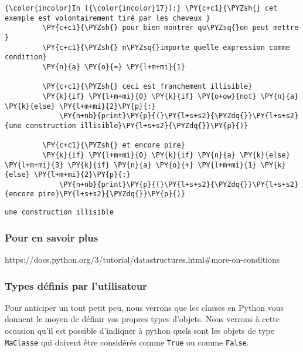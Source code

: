     \begin{Verbatim}[commandchars=\\\{\},frame=single,framerule=0.3mm,rulecolor=\color{cellframecolor}]
{\color{incolor}In [{\color{incolor}17}]:} \PY{c+c1}{\PYZsh{} cet exemple est volontairement tiré par les cheveux }
         \PY{c+c1}{\PYZsh{} pour bien montrer qu\PYZsq{}on peut mettre }
         \PY{c+c1}{\PYZsh{} n\PYZsq{}importe quelle expression comme condition}
         \PY{n}{a} \PY{o}{=} \PY{l+m+mi}{1}
         
         \PY{c+c1}{\PYZsh{} ceci est franchement illisible}
         \PY{k}{if} \PY{l+m+mi}{0} \PY{k}{if} \PY{o+ow}{not} \PY{n}{a} \PY{k}{else} \PY{l+m+mi}{2}\PY{p}{:}
             \PY{n+nb}{print}\PY{p}{(}\PY{l+s+s2}{\PYZdq{}}\PY{l+s+s2}{une construction illisible}\PY{l+s+s2}{\PYZdq{}}\PY{p}{)}
         
         \PY{c+c1}{\PYZsh{} et encore pire}
         \PY{k}{if} \PY{l+m+mi}{0} \PY{k}{if} \PY{n}{a} \PY{k}{else} \PY{l+m+mi}{3} \PY{k}{if} \PY{n}{a} \PY{o}{+} \PY{l+m+mi}{1} \PY{k}{else} \PY{l+m+mi}{2}\PY{p}{:}
             \PY{n+nb}{print}\PY{p}{(}\PY{l+s+s2}{\PYZdq{}}\PY{l+s+s2}{encore pire}\PY{l+s+s2}{\PYZdq{}}\PY{p}{)}
\end{Verbatim}


    \begin{Verbatim}[commandchars=\\\{\},frame=single,framerule=0.3mm,rulecolor=\color{cellframecolor}]
une construction illisible
\end{Verbatim}

    \hypertarget{pour-en-savoir-plus}{%
\subsubsection{Pour en savoir plus}\label{pour-en-savoir-plus}}

    https://docs.python.org/3/tutorial/datastructures.html\#more-on-conditions

    \hypertarget{types-duxe9finis-par-lutilisateur}{%
\subsubsection{Types définis par
l'utilisateur}\label{types-duxe9finis-par-lutilisateur}}

    Pour anticiper un tout petit peu, nous verrons que les classes en Python
vous donnent le moyen de définir vos propres types d'objets. Nous
verrons à cette occasion qu'il est possible d'indiquer à python quels
sont les objets de type \texttt{MaClasse} qui doivent être considérés
comme \texttt{True} ou comme \texttt{False}.

